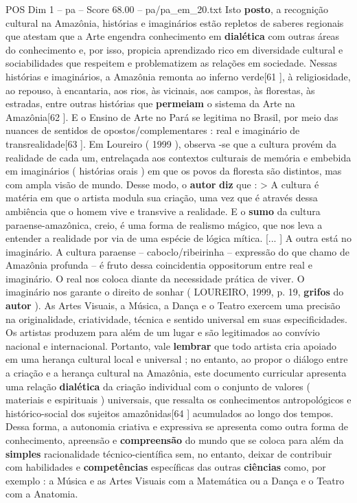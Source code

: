 \begin{textsample}{POS Dim 1 – pa – Score 68.00 – pa/pa\_em\_20.txt}
Isto \textbf{posto}, a recognição cultural na Amazônia, histórias e imaginários estão repletos de saberes regionais que atestam que a Arte engendra conhecimento em \textbf{dialética} com outras áreas do conhecimento e, por isso, propicia aprendizado rico em diversidade cultural e sociabilidades que respeitem e problematizem as relações em sociedade.
Nessas histórias e imaginários, a Amazônia remonta ao inferno verde[61 ], à religiosidade, ao repouso, à encantaria, aos rios, às vicinais, aos campos, às florestas, às estradas, entre outras histórias que \textbf{permeiam} o sistema da Arte na Amazônia[62 ].
E o Ensino de Arte no Pará se legitima no Brasil, por meio das nuances de sentidos de opostos/complementares : real e imaginário de transrealidade[63 ].
Em Loureiro ( 1999 ), observa -se que a cultura provém da realidade de cada um, entrelaçada aos contextos culturais de memória e embebida em imaginários ( histórias orais ) em que os povos da floresta são distintos, mas com ampla visão de mundo.
Desse modo, o \textbf{autor} \textbf{diz} que : > A cultura é matéria em que o artista modula sua criação, uma vez que é através dessa ambiência que o homem vive e transvive a realidade.
E o \textbf{sumo} da cultura paraense-amazônica, creio, é uma forma de realismo mágico, que nos leva a entender a realidade por via de uma espécie de lógica mítica. [... ] A outra está no imaginário.
A cultura paraense – caboclo/ribeirinha – expressão do que chamo de Amazônia profunda – é fruto dessa coincidentia oppositorum entre real e imaginário.
O real nos coloca diante da necessidade prática de viver.
O imaginário nos garante o direito de sonhar ( LOUREIRO, 1999, p. 19, \textbf{grifos} do \textbf{autor} ).
As Artes Visuais, a Música, a Dança e o Teatro exercem uma precisão na originalidade, criatividade, técnica e sentido universal em suas especificidades.
Os artistas produzem para além de um lugar e são legitimados ao convívio nacional e internacional.
Portanto, vale \textbf{lembrar} que todo artista cria apoiado em uma herança cultural local e universal ; no entanto, ao propor o diálogo entre a criação e a herança cultural na Amazônia, este documento curricular apresenta uma relação \textbf{dialética} da criação individual com o conjunto de valores ( materiais e espirituais ) universais, que ressalta os conhecimentos antropológicos e histórico-social dos sujeitos amazônidas[64 ] acumulados ao longo dos tempos.
Dessa forma, a autonomia criativa e expressiva se apresenta como outra forma de conhecimento, apreensão e \textbf{compreensão} do mundo que se coloca para além da \textbf{simples} racionalidade técnico-científica sem, no entanto, deixar de contribuir com habilidades e \textbf{competências} específicas das outras \textbf{ciências} como, por exemplo : a Música e as Artes Visuais com a Matemática ou a Dança e o Teatro com a Anatomia.

\end{textsample}

